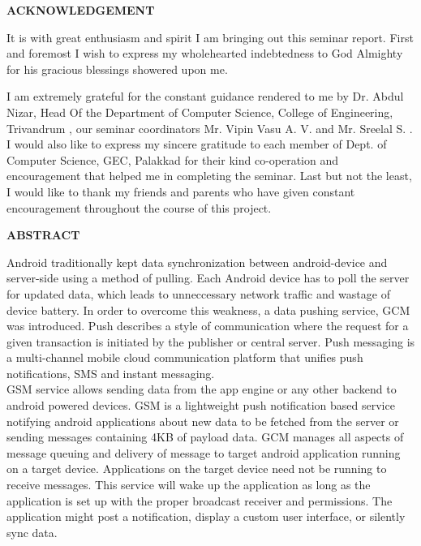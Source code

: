 \newpage
{}
\begin{center}
\bf{{\LARGE ACKNOWLEDGEMENT}}
\end{center}
\begin{Large}
\begin{spacing}{1.1}
\vspace{1cm}
\hspace{2cm}
It is with great enthusiasm and spirit I am bringing out this seminar report. First and foremost I wish to express my wholehearted indebtedness to God Almighty for his gracious  blessings showered upon me.

\hspace{2cm} 
I am extremely grateful for the constant guidance rendered to me by Dr. Abdul Nizar, Head Of the Department of Computer Science, College of Engineering, Trivandrum , our seminar coordinators Mr. Vipin Vasu A. V. and Mr. Sreelal S. . I would also like to express my sincere gratitude to each member of Dept. of Computer Science, GEC, Palakkad for their kind co-operation and encouragement that helped me in completing the seminar. Last but not the least, I would like to thank my friends and parents who have given constant encouragement throughout the course of this project.
\end{spacing}
\end{Large}
\newpage
\begin{center}{\bf{\LARGE ABSTRACT}}
\end{center}
\begin{Large}
\begin{spacing}{1.1}
Android traditionally kept data synchronization between android-device and server-side using a method of pulling. Each 
		Android device has to poll the server for updated data, which leads to unneccessary network traffic
		and wastage of device battery. In order to overcome this weakness, a data pushing service, GCM was introduced.
		Push describes a style of communication where the request for a given transaction is initiated by the publisher
		or central server. Push messaging is a multi-channel mobile cloud communication platform that unifies push
		notifications, SMS and instant messaging.\\ GSM service allows sending data from the app engine or 
		any other backend to android powered devices. GSM is a lightweight push notification based service notifying
		android applications about new data to be fetched from the server or sending messages containing 4KB
		of payload data. GCM manages all aspects of message queuing and delivery of message to target android
		application running on a target device. Applications on the target device need not be running to receive
		messages. This service will wake up the application as long as the application is set up with the proper broadcast 
		receiver and permissions. The application might post a
		notification, display a custom user interface,
		or silently sync data.
\end{spacing}
\end{Large}

